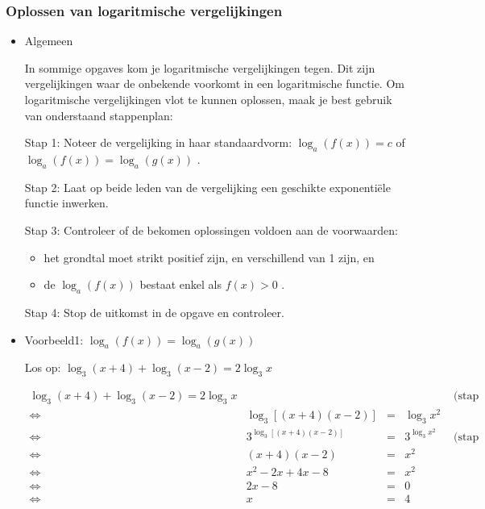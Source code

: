 \subsubsection{Oplossen van logaritmische vergelijkingen}

\begin{itemize}
\item{Algemeen}

In sommige opgaves kom je logaritmische vergelijkingen tegen. Dit
zijn vergelijkingen waar de onbekende voorkomt in een logaritmische
functie. Om logaritmische vergelijkingen vlot te kunnen oplossen,
maak je best gebruik van onderstaand stappenplan:\medskip{}


Stap 1: Noteer de vergelijking in haar standaardvorm: ${\displaystyle \log_{a}\left(f(x)\right)=c}$
of ${\displaystyle \log_{a}\left(f(x)\right)=\log_{a}\left(g(x)\right)}$
.

Stap 2: Laat op beide leden van de vergelijking een geschikte exponenti\"ele
functie inwerken.

Stap 3: Controleer of de bekomen oplossingen voldoen aan de voorwaarden:
\begin{itemize}
	\item het grondtal moet strikt positief zijn, en verschillend van 1 zijn,
	en
	\item de ${\displaystyle \log_{a}\left(f(x)\right)}$ bestaat enkel als
	${\displaystyle f(x)>0}$ . 
\end{itemize}
Stap 4: Stop de uitkomst in de opgave en controleer.


\item{Voorbeeld1: ${\displaystyle \log_{a}\left(f(x)\right)=\log_{a}\left(g(x)\right)}$ }

Los op: ${\displaystyle \log_{3}(x+4)+\log_{3}(x-2)=2\log_{3}x}$

\[
{\displaystyle \begin{split}{\displaystyle \log_{3}(x+4)+\log_{3}(x-2)=2\log_{3}x} &  &  &  & \text{ (stap 1)}\\
	\Longleftrightarrow & \log_{3}\left[\left(x+4\right)\left(x-2\right)\right] & = & \log_{3}x^{2}\\
	\Longleftrightarrow & 3^{\log_{3}\left[\left(x+4\right)\left(x-2\right)\right]} & = & 3^{\log_{3}x^{2}} & \text{ (stap 2)}\\
	\Longleftrightarrow & \left(x+4\right)\left(x-2\right) & = & x^{2}\\
	\Longleftrightarrow & x^{2}-2x+4x-8 & = & x^{2}\\
	\Longleftrightarrow & 2x-8 & = & 0\\
	\Longleftrightarrow & x & = & 4
	\end{split}
}
\]



\end{itemize}
